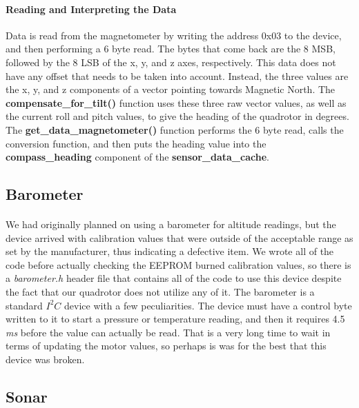 \paragraph{Reading and Interpreting the Data}
Data is read from the magnetometer by writing the address 0x03 to the device, and then performing a 6 byte read.  The bytes that come back are the 8 MSB, followed by the 8 LSB of the x, y, and z axes, respectively.  This data does not have any offset that needs to be taken into account.  Instead, the three values are the x, y, and z components of a vector pointing towards Magnetic North.  The {\bf compensate\_for\_tilt()} function uses these three raw vector values, as well as the current roll and pitch values, to give the heading of the  quadrotor in degrees.  The {\bf get\_data\_magnetometer()} function performs the 6 byte read, calls the conversion function, and then puts the heading value into the {\bf compass\_heading} component of the {\bf sensor\_data\_cache}.

\subsection{Barometer}

\paragraph{}
We had originally planned on using a barometer for altitude readings, but the device arrived with calibration values that were outside of the acceptable range as set by the manufacturer, thus indicating a defective item.  We wrote all of the code before actually checking the EEPROM burned calibration values, so there is a {\it barometer.h} header file that contains all of the code to use this device despite the fact that our quadrotor does not utilize any of it.  The barometer is a standard $I^{2}C$ device with a few peculiarities.  The device must have a control byte written to it to start a pressure or temperature reading, and then it requires 4.5 {\it ms} before the value can actually be read.  That is a very long time to wait in terms of updating the motor values, so perhaps is was for the best that this device was broken.

\subsection{Sonar}

